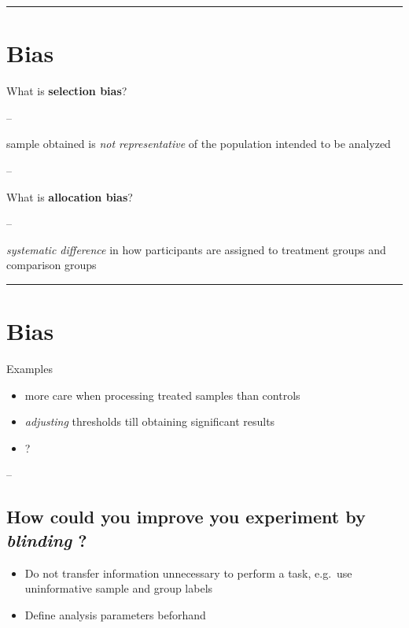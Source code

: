 \documentclass[]{article}
\providecommand{\tightlist}{%
  \setlength{\itemsep}{0pt}\setlength{\parskip}{0pt}}
\begin{document}
\begin{center}\rule{0.5\linewidth}{\linethickness}\end{center}

\hypertarget{bias}{%
\section{Bias}\label{bias}}

What is \textbf{selection bias}?

--

sample obtained is \emph{not representative} of the population intended
to be analyzed

--

What is \textbf{allocation bias}?

--

\emph{systematic difference} in how participants are assigned to
treatment groups and comparison groups

\begin{center}\rule{0.5\linewidth}{\linethickness}\end{center}

\hypertarget{bias-1}{%
\section{Bias}\label{bias-1}}

Examples

\begin{itemize}
\tightlist
\item
  more care when processing treated samples than controls
\item
  \emph{adjusting} thresholds till obtaining significant results
\item
  ?
\end{itemize}

--

\hypertarget{how-could-you-improve-you-experiment-by-blinding}{%
\subsection{\texorpdfstring{How could you improve you experiment by
\emph{blinding}
?}{How could you improve you experiment by blinding ?}}\label{how-could-you-improve-you-experiment-by-blinding}}

\begin{itemize}
\tightlist
\item
  Do not transfer information unnecessary to perform a task, e.g.~use
  uninformative sample and group labels
\item
  Define analysis parameters beforhand
\end{itemize}
\end{document}
